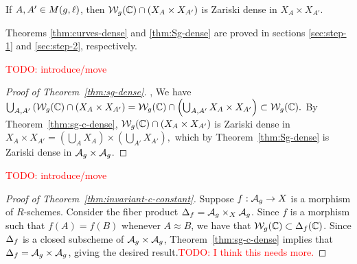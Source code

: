 \documentclass{amsart}
\begin{document}
\begin{theorem}\label{thm:Sg-dense}
  If $A,A' \in M(g,\ell)$, then $\mathcal{W}_g(\mathbb{C}) \cap (X_A \times X_{A'})$ is Zariski dense in $X_A \times X_{A'}$.
\end{theorem}

Theorems \ref{thm:curves-dense} and \ref{thm:Sg-dense} are proved in sections \ref{sec:step-1} and \ref{sec:step-2}, respectively.

\textcolor{red}{TODO: introduce/move}

\begin{proof}[Proof of Theorem~\ref{thm:sg-dense}], 
We have 
$\bigcup_{A,A'} \left(\mathcal{W}_g(\mathbb{C}) \cap (X_A \times X_{A'}\right) =  \mathcal{W}_g(\mathbb{C}) \cap \left(\bigcup_{A,A'} X_A \times X_{A'}\right)
   \subset \mathcal{W}_g(\mathbb{C}).$
By Theorem~\ref{thm:sg-c-dense},
$\mathcal{W}_g(\mathbb{C}) \cap (X_A \times X_{A'})$ is Zariski dense in $X_A \times X_{A'} =
    \left(\bigcup_{A} X_A\right) \times \left(\bigcup_{A'} X_{A'}\right),$ which by Theorem~\ref{thm:Sg-dense} is Zariski dense in $\mathcal{A}_g \times \mathcal{A}_g$.
\end{proof}

\textcolor{red}{TODO: introduce/move}

\begin{proof}[Proof of Theorem~\ref{thm:invariant-c-constant}]
  Suppose $f: \mathcal{A}_g \to X$ is a morphism of $R$-schemes. Consider the fiber product $\Delta_f = \mathcal{A}_g \times_X \mathcal{A}_g$. 
Since $f$ is a morphism such that $f(A) = f(B)$ whenever $A \approx B$, we have that $\mathcal{W}_g(\mathbb{C}) \subset \Delta_f(\mathbb{C})$.
   Since $\Delta_f$ is a closed subscheme of $\mathcal{A}_g \times \mathcal{A}_g$, Theorem~\ref{thm:sg-c-dense} implies that $\Delta_f = \mathcal{A}_g \times \mathcal{A}_g$, giving the desired result.\textcolor{red}{TODO: I think this needs more.}
\end{proof}
\end{document}
